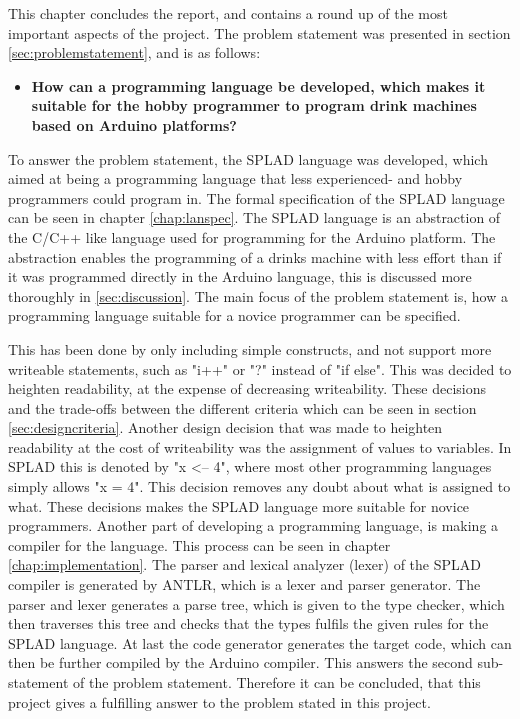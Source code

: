 This chapter concludes the report, and contains a round up of the most important aspects of the project.
The problem statement was presented in section \ref{sec:problemstatement}, and is as follows: 
\begin{itemize}
	\item \textbf{How can a programming language be developed, which makes it suitable for the hobby programmer to program drink machines based on Arduino platforms?}
\end{itemize}

To answer the problem statement, the SPLAD language was developed, which aimed at being a programming language that less experienced- and hobby programmers could program in. The formal specification of the SPLAD language can be seen in chapter \ref{chap:lanspec}. The SPLAD language is an abstraction of the C/C++ like language used for programming for the Arduino platform. The abstraction enables the programming of a drinks machine with less effort than if it was programmed directly in the Arduino language, this is discussed more thoroughly in \ref{sec:discussion}. The main focus of the problem statement is, how a programming language suitable for a novice programmer can be specified.

This has been done by only including simple constructs, and not support more writeable statements, such as "i++" or "?" instead of "if else". This was decided to heighten readability, at the expense of decreasing writeability. These decisions and the trade-offs between the different criteria which can be seen in section \ref{sec:designcriteria}. Another design decision that was made to heighten readability at the cost of writeability was the assignment of values to variables. In SPLAD this is denoted by "x <-- 4", where most other programming languages simply allows "x = 4". This decision removes any doubt about what is assigned to what. These decisions makes the SPLAD language more suitable for novice programmers.
Another part of developing a programming language, is making a compiler for the language. This process can be seen in chapter \ref{chap:implementation}. The parser and lexical analyzer (lexer) of the SPLAD compiler is generated by ANTLR, which is a lexer and parser generator. The parser and lexer generates a parse tree, which is given to the type checker, which then traverses this tree and checks that the types fulfils the given rules for the SPLAD language. At last the code generator generates the target code, which can then be further compiled by the Arduino compiler. This answers the second sub-statement of the problem statement. Therefore it can be concluded, that this project gives a fulfilling answer to the problem stated in this project. 